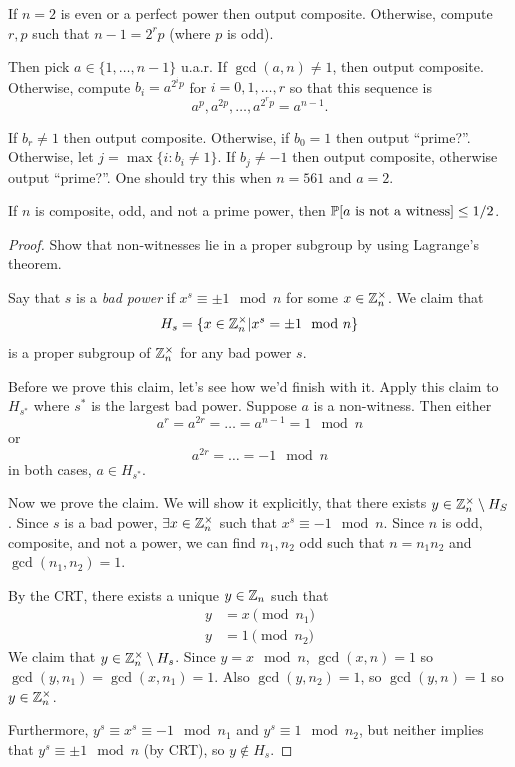 \documentclass[11 pt]{scrartcl}
\begin{document}
\begin{example}
    If $n = 2$ is even or a perfect power then output composite. Otherwise, compute $r,p$ such that $n - 1 = 2^{r}p$ (where $p$ is odd). 

    Then pick $a \in \{1, \dots, n-1\}$ u.a.r. If $\gcd(a,n) \not= 1$, then output composite. Otherwise, compute $b_i = a^{2^i p}$ for $i = 0, 1, \dots, r$ so that this sequence is 
    \[a^p, a^{2p}, \dots, a^{2^r p} = a^{n-1}.\]

    If $b_r \not= 1$ then output composite. Otherwise, if $b_0 = 1$ then output ``prime?''. Otherwise, let $j = \max\{i : b_i \not= 1\}$. If $b_j \not= -1$ then output composite, otherwise output ``prime?''. One should try this when $n = 561$ and $a =2 $. 

    \begin{claim}
        If $n$ is composite, odd, and not a prime power, then $\mathbb P[a\text{ is not a witness}] \leq 1/2$. 
    \end{claim}
    \begin{proof}
        Show that non-witnesses lie in a proper subgroup by using Lagrange's theorem. 

        Say that $s$ is a \emph{bad power} if $x^s \equiv \pm 1 \mod n$ for some $x \in \mathbb Z^\times_n$. We claim that 
        \[ H_s = \{x \in \mathbb Z_n^\times | x^s = \pm 1 \mod n\}\] 
        is a proper subgroup of $\mathbb Z_n^\times$ for any bad power $s$. 

    Before we prove this claim, let's see how we'd finish with it. Apply this claim to $H_{s^*}$ where $s^*$ is the largest bad power. Suppose $a$ is a non-witness. Then either 
    \[ a^r = a^{2r} = \dots = a^{n-1} = 1\mod n\]
    or 
    \[ a^{2r} = \dots = -1 \mod n\] 
    in both cases, $a \in H_{s^*}$. 

    Now we prove the claim. We will show it explicitly, that there exists $y \in \mathbb Z_n^\times \setminus H_S$. Since $s$ is a bad power, $\exists x \in \mathbb Z_n^\times $ such that $x^s \equiv -1 \mod n$. Since $n$ is odd, composite, and not a power, we can find $n_1, n_2$ odd such that $n = n_1n_2$ and $\gcd(n_1, n_2) = 1$. 

    By the CRT, there exists a unique $y \in \mathbb Z_n$ such that 
    \begin{align*}
        y &= x \pmod{n_1} \\ 
        y &= 1 \pmod{n_2} 
    \end{align*}
    We claim that $y \in \mathbb Z_n^\times \setminus H_s$. Since $y = x \mod n$, $\gcd(x,n) = 1$ so $\gcd(y, n_1) = \gcd(x, n_1) = 1$. Also $\gcd(y, n_2) = 1$, so $\gcd(y, n) = 1$ so $y\in \mathbb Z_n^\times$. 

    Furthermore, $y^s \equiv x^s \equiv -1 \mod n_1$ and $y^s \equiv 1 \mod n_2$, but neither implies that $y^s \equiv \pm 1 \mod n$ (by CRT), so $y\not\in H_s$. 
    \end{proof}
\end{example}
\end{document}
